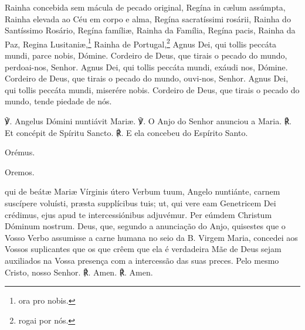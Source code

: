 \begin{paracol}{2}
\switchcolumn
Rainha concebida sem mácula de pecado original,
\switchcolumn*
Regína in cælum assúmpta,
\switchcolumn
Rainha elevada ao Céu em corpo e alma,
\switchcolumn*
Regína sacratíssimi rosárii,
\switchcolumn
Rainha do Santíssimo Rosário,
\switchcolumn*
Regína famíliæ,
\switchcolumn
Rainha da Família,
\switchcolumn*
Regína pacis,
\switchcolumn
Rainha da Paz,
\switchcolumn*
Regina Lusitaniæ,\footnote[2]{ora pro nobis.\label{ora}}
\switchcolumn
Rainha de Portugal,\footnote[2]{rogai por nós.\label{rogai}}
\switchcolumn*
Agnus Dei, qui tollis peccáta mundi, parce nobis, Dómine.
\switchcolumn
Cordeiro de Deus, que tirais o pecado do mundo, perdoai-nos, Senhor.
\switchcolumn*
Agnus Dei, qui tollis peccáta mundi, exáudi nos, Dómine.
\switchcolumn
Cordeiro de Deus, que tirais o pecado do mundo, ouvi-nos, Senhor.
\switchcolumn*
Agnus Dei, qui tollis peccáta mundi, miserére nobis.
\switchcolumn
Cordeiro de Deus, que tirais o pecado do mundo, tende piedade de nós.
\end{paracol}

\begin{nscenter}\emph{}\end{nscenter}

\begin{paracol}{2}
℣. Angelus Dómini nuntiávit Mariæ.
\switchcolumn
℣. O Anjo do Senhor anunciou a Maria.
\switchcolumn*
℟. Et concépit de Spíritu Sancto.
\switchcolumn
℟. E ela concebeu do Espírito Santo.
\switchcolumn*
\begin{nscenter} {\redx Orémus.} \end{nscenter}
\switchcolumn
\begin{nscenter} {\redx Oremos.} \end{nscenter}
\switchcolumn*
{} qui de beátæ Mariæ Vírginis útero Verbum tuum, Angelo nuntiánte, carnem suscípere voluísti, præsta supplícibus tuis; ut, qui vere eam Genetricem Dei crédimus, ejus apud te intercessiónibus adjuvémur. Per eúmdem Christum Dóminum nostrum.
\switchcolumn
{} Deus, que, segundo a anunciação do Anjo, quisestes que o Vosso Verbo assumisse a carne humana no seio da B. Virgem Maria, concedei aos Vossos suplicantes que os que crêem que ela é verdadeira Mãe de Deus sejam auxiliados na Vossa presença com a intercessão das suas preces. Pelo mesmo Cristo, nosso Senhor.
\switchcolumn*
℟. Amen.
\switchcolumn
℟. Amen.
\end{paracol}


